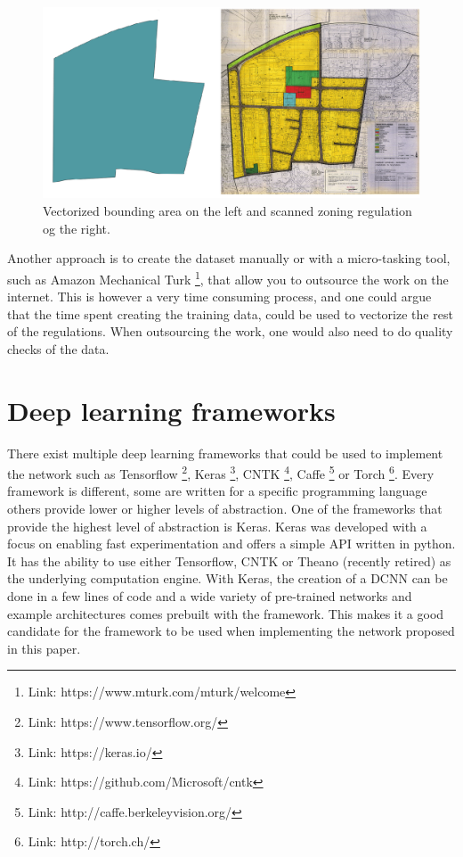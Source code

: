\begin{figure}[H]
	\centering
	\includegraphics[width=\linewidth]{fig/georef-problem.png}
	\caption{Vectorized bounding area on the left and scanned zoning regulation og the right.}
	\label{fig:georeferencing}
\end{figure}

Another approach is to create the dataset manually or with a micro-tasking tool, such as Amazon Mechanical Turk \footnote{Link: https://www.mturk.com/mturk/welcome}, that allow you to outsource the work on the internet. This is however a very time consuming process, and one could argue that the time spent creating the training data, could be used to vectorize the rest of the regulations. When outsourcing the work, one would also need to do quality checks of the data. 


\section{Deep learning frameworks}
There exist multiple deep learning frameworks that could be used to implement the network such as Tensorflow \footnote{Link: https://www.tensorflow.org/}, Keras \footnote{Link: https://keras.io/}, CNTK \footnote{Link: https://github.com/Microsoft/cntk}, Caffe \footnote{Link: http://caffe.berkeleyvision.org/} or Torch \footnote{Link: http://torch.ch/}.  Every framework is different, some are written for a specific programming language others provide lower or higher levels of abstraction. One of the frameworks that provide the highest level of abstraction is Keras. Keras was developed with a focus on enabling fast experimentation and offers a simple API written in python. It has the ability to use either Tensorflow, CNTK or Theano (recently retired) as the underlying computation engine. With Keras, the creation of a DCNN can be done in a few lines of code and a wide variety of pre-trained networks and example architectures comes prebuilt with the framework. This makes it a good candidate for the framework to be used when implementing the network proposed in this paper. 


